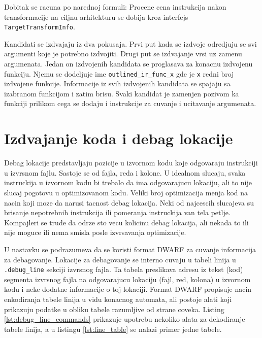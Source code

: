 \documentclass[12pt,oneside]{memoir}
\begin{document}
Dobitak se racuna po narednoj formuli:
Procene cena instrukcija nakon transformacije na ciljnu arhitekturu se dobija kroz interfejs \verb|TargetTransformInfo|.

Kandidati se izdvajaju iz dva pokusaja. Prvi put kada se izdvoje odredjuju se svi argumenti koje je potrebno izdvojiti.
Drugi put se izdvajanje vrsi uz zamenu argumenata. Jedan on izdvojenih kandidata se proglasava za konacnu izdvojenu funkciju.
Njemu se dodeljuje ime \verb|outlined_ir_func_x| gde je \verb|x| redni broj izdvojene funkcije.
Informacije iz svih izdvojenih kandidata se spajaju sa izabranom funkcijom i zatim brisu.
Svaki kandidat je zamenjen pozivom ka funkciji prilikom cega se dodaju i instrukcije za cuvanje i ucitavanje argumenata.

\section{Izdvajanje koda i debag lokacije}


Debag lokacije predstavljaju pozicije u izvornom kodu koje odgovaraju instrukciji u izvrsnom fajlu. Sastoje se od fajla, reda i kolone.
U idealnom slucaju, svaka instruckija u izvornom kodu bi trebalo da ima odgovarajucu lokaciju, ali to nije slucaj pogotovu u optimizovanom kodu.
Veliki broj optimizacija menja kod na nacin koji moze da narusi tacnost debag lokacija.
Neki od najcescih slucajeva su brisanje nepotrebnih instrukcija ili pomeranja instruckija van tela petlje.
Kompajleri se trude da odrze sto vecu kolicinu debag lokacija, ali nekada to ili nije moguce ili nema smisla posle izvrsavanja optimizacije.

U nastavku se podrazumeva da se koristi format DWARF za cuvanje informacija za debagovanje.
Lokacije za debagovanje se interno cuvaju u tabeli linija u \verb|.debug_line| sekciji izvrsnog fajla.
Ta tabela preslikava adresu iz tekst (kod) segmenta izvrsnog fajla na odgovarajucu lokaciju (fajl, red, kolona) u izvornom kodu i neke dodatne informacije o toj lokaciji.
Format DWARF propisuje nacin enkodiranja tabele linija u vidu konacnog automata, ali postoje alati koji prikazuju podatke u obliku tabele razumljive od strane coveka.
Listing \ref{lst:debug_line_commands} prikazuje upotrebu nekoliko alata za dekodiranje tabele linija, a u listingu \ref{lst:line_table} se nalazi primer jedne tabele.
\end{document}
